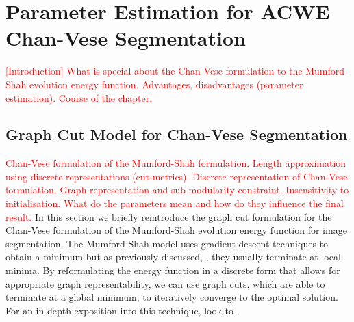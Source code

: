 
\chapter{Parameter Estimation for ACWE Chan-Vese Segmentation} %

\label{chap:Chapter6} %

\textcolor{red}{[Introduction] What is special about the Chan-Vese formulation to the Mumford-Shah evolution energy function. Advantages, disadvantages (parameter estimation). Course of the chapter.}


\section{Graph Cut Model for Chan-Vese Segmentation}
\label{sec:chanveseGC}

\textcolor{red}{Chan-Vese formulation of the Mumford-Shah formulation. Length approximation using discrete representations (cut-metrics). Discrete representation of Chan-Vese formulation. Graph representation and sub-modularity constraint. Insensitivity to initialisation. What do the parameters mean and how do they influence the final result.}
In this section we briefly reintroduce the graph cut formulation for the Chan-Vese formulation of the Mumford-Shah evolution energy function for image segmentation. The Mumford-Shah model uses gradient descent techniques to obtain a minimum but as previously discussed, , they usually terminate at local minima. By reformulating the energy function in a discrete form that allows for appropriate graph representability, we can use graph cuts, which are able to terminate at a global minimum, to iteratively converge to the optimal solution. For an in-depth exposition into this technique, look to \citep{Mumford1989,Chan2001,ElZehiry2007}.

